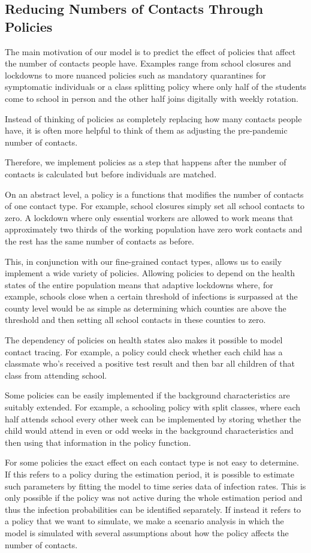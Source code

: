 \subsection{Reducing Numbers of Contacts Through Policies}
\label{sec:policies}

The main motivation of our model is to predict the effect of policies that affect the
number of contacts people have. Examples range from school closures and lockdowns to
more nuanced policies such as mandatory quarantines for symptomatic individuals or a
class splitting policy where only half of the students come to school in person and the
other half joins digitally with weekly rotation.

Instead of thinking of policies as completely replacing how many contacts people have,
it is often more helpful to think of them as adjusting the pre-pandemic number of
contacts.

Therefore, we implement policies as a step that happens after the number of contacts is
calculated but before individuals are matched.

On an abstract level, a policy is a functions that modifies the number of contacts of
one contact type. For example, school closures simply set all school contacts to zero. A
lockdown where only essential workers are allowed to work means that approximately two
thirds of the working population have zero work contacts and the rest has the same
number of contacts as before.

This, in conjunction with our fine-grained contact types, allows us to easily implement
a wide variety of policies. Allowing policies to depend on the health states of the
entire population means that adaptive lockdowns where, for example, schools close when a
certain threshold of infections is surpassed at the county level would be as simple as
determining which counties are above the threshold and then setting all school contacts
in these counties to zero.

The dependency of policies on health states also makes it possible to model contact
tracing. For example, a policy could check whether each child has a classmate who's
received a positive test result and then bar all children of that class from attending
school.

Some policies can be easily implemented if the background characteristics are suitably
extended. For example, a schooling policy with split classes, where each half attends
school every other week can be implemented by storing whether the child would attend in
even or odd weeks in the background characteristics and then using that information in
the policy function.

For some policies the exact effect on each contact type is not easy to determine. If
this refers to a policy during the estimation period, it is possible to estimate such
parameters by fitting the model to time series data of infection rates. This is only
possible if the policy was not active during the whole estimation period and thus the
infection probabilities can be identified separately. If instead it refers to a policy
that we want to simulate, we make a scenario analysis in which the model is simulated
with several assumptions about how the policy affects the number of contacts.
